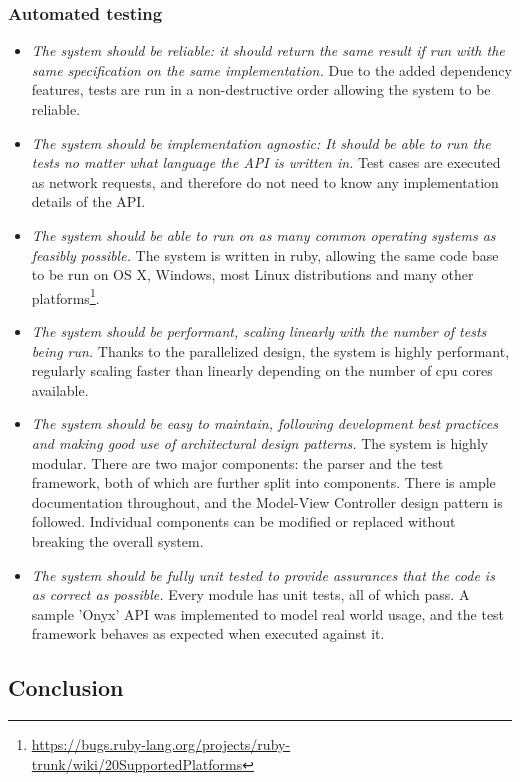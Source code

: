 \subsubsection{Automated testing}
\begin{itemize}
\item \emph{The system should be reliable: it should return the same result if run with the same specification on the same implementation.} Due to the added dependency features, tests are run in a non-destructive order allowing the system to be reliable.
\item \emph{The system should be implementation agnostic: It should be able to run the tests no matter what language the API is written in.} Test cases are executed as network requests, and therefore do not need to know any implementation details of the API.
\item \emph{The system should be able to run on as many common operating systems as feasibly possible.} The system is written in ruby, allowing the same code base to be run on OS X, Windows, most Linux distributions and many other platforms\footnote{\url{https://bugs.ruby-lang.org/projects/ruby-trunk/wiki/20SupportedPlatforms}}.
\item \emph{The system should be performant, scaling linearly with the number of tests being run.} Thanks to the parallelized design, the system is highly performant, regularly scaling faster than linearly depending on the number of cpu cores available. 
\item \emph{The system should be easy to maintain, following development best practices and making good use of architectural design patterns.} The system is highly modular. There are two major components: the parser and the test framework, both of which are further split into components. There is ample documentation throughout, and the Model-View Controller design pattern is followed. Individual components can be modified or replaced without breaking the overall system.
\item \emph{The system should be fully unit tested to provide assurances that the code is as correct as possible.} Every module has unit tests, all of which pass. A sample 'Onyx' API was implemented to model real world usage, and the test framework behaves as expected when executed against it.
\end{itemize}

\subsection{Conclusion}

